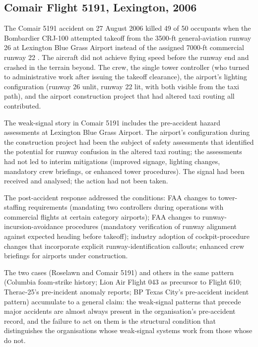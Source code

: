 \subsection*{Comair Flight 5191, Lexington, 2006}

The Comair 5191 accident on 27 August 2006 killed 49 of 50 occupants when the Bombardier CRJ-100 attempted takeoff from the 3500-ft general-aviation runway 26 at Lexington Blue Grass Airport instead of the assigned 7000-ft commercial runway 22 \cite{acc:ntsb-aar07-05}. The aircraft did not achieve flying speed before the runway end and crashed in the terrain beyond. The crew, the single tower controller (who turned to administrative work after issuing the takeoff clearance), the airport's lighting configuration (runway 26 unlit, runway 22 lit, with both visible from the taxi path), and the airport construction project that had altered taxi routing all contributed.

The weak-signal story in Comair 5191 includes the pre-accident hazard assessments at Lexington Blue Grass Airport. The airport's configuration during the construction project had been the subject of safety assessments that identified the potential for runway confusion in the altered taxi routing; the assessments had not led to interim mitigations (improved signage, lighting changes, mandatory crew briefings, or enhanced tower procedures). The signal had been received and analysed; the action had not been taken.

The post-accident response addressed the conditions: FAA changes to tower-staffing requirements (mandating two controllers during operations with commercial flights at certain category airports); FAA changes to runway-incursion-avoidance procedures (mandatory verification of runway alignment against expected heading before takeoff); industry adoption of cockpit-procedure changes that incorporate explicit runway-identification callouts; enhanced crew briefings for airports under construction.

The two cases (Roselawn and Comair 5191) and others in the same pattern (Columbia foam-strike history; Lion Air Flight 043 as precursor to Flight 610; Therac-25's pre-incident anomaly reports; BP Texas City's pre-accident incident pattern) accumulate to a general claim: the weak-signal patterns that precede major accidents are almost always present in the organisation's pre-accident record, and the failure to act on them is the structural condition that distinguishes the organisations whose weak-signal systems work from those whose do not.

